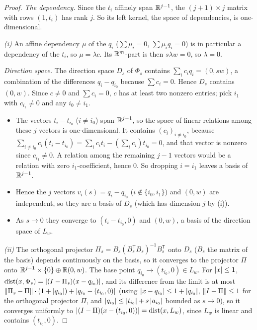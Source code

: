 \documentclass[11pt]{article}
\begin{document}
\begin{proof}
\emph{The dependency.} Since the $t_i$ affinely span $\mathbb{R}^{j-1}$, the $(j+1) \times j$ matrix with
rows $(1, t_i)$ has rank $j$. So its left kernel, the space of dependencies, is one-dimensional.

\emph{(i)} An affine dependency $\mu$ of the $q_i$ ($\sum \mu_i = 0$, $\sum \mu_i q_i = 0$) is in
particular a dependency of the $t_i$, so $\mu = \lambda c$. Its $\mathbb{R}^m$-part is then
$s \lambda w = 0$, so $\lambda = 0$.

\emph{Direction space.} The direction space $D_s$ of $\Phi_s$ contains
$\sum_i c_i q_i = (0, s w)$, a combination of the differences $q_i - q_{i_0}$ because
$\sum c_i = 0$. Hence $D_s$ contains $(0, w)$. Since $c \ne 0$ and $\sum c_i = 0$, $c$ has at least
two nonzero entries; pick $i_1$ with $c_{i_1} \ne 0$ and any $i_0 \ne i_1$.
\begin{itemize}
  \item The vectors $t_i - t_{i_0}$ ($i \ne i_0$) span $\mathbb{R}^{j-1}$, so the space of linear relations
    among these $j$ vectors is one-dimensional. It contains $(c_i)_{i \ne i_0}$, because
    $\sum_{i \ne i_0} c_i (t_i - t_{i_0}) = \sum_i c_i t_i - (\sum_i c_i) t_{i_0} = 0$, and that
    vector is nonzero since $c_{i_1} \ne 0$. A relation among the remaining $j-1$ vectors would be a
    relation with zero $i_1$-coefficient, hence $0$. So dropping $i = i_1$ leaves a basis of
    $\mathbb{R}^{j-1}$.
  \item Hence the $j$ vectors $v_i(s) = q_i - q_{i_0}$ ($i \notin \{i_0, i_1\}$) and $(0, w)$ are
    independent, so they are a basis of $D_s$ (which has dimension $j$ by (i)).
  \item As $s \to 0$ they converge to $(t_i - t_{i_0}, 0)$ and $(0, w)$, a basis of the direction
    space of $L_w$.
\end{itemize}

\emph{(ii)} The orthogonal projector $\Pi_s = B_s (B_s^{\mathsf T} B_s)^{-1} B_s^{\mathsf T}$ onto
$D_s$ ($B_s$ the matrix of the basis) depends continuously on the basis, so it converges to the
projector $\Pi$ onto $\mathbb{R}^{j-1} \times \{0\} \oplus \mathbb{R}(0, w)$. The base point
$q_{i_0} \to (t_{i_0}, 0) \in L_w$. For $\left|x\right| \le 1$,
$\operatorname{dist}(x, \Phi_s) = \left|(I - \Pi_s)(x - q_{i_0})\right|$, and its difference from the limit is at most
$\left\|\Pi_s - \Pi\right\| \cdot (1 + \left|q_{i_0}\right|) + \left|q_{i_0} - (t_{i_0}, 0)\right|$ (using
$\left|x - q_{i_0}\right| \le 1 + \left|q_{i_0}\right|$, $\left\|I - \Pi\right\| \le 1$ for the orthogonal projector $\Pi$,
and $\left|q_{i_0}\right| \le \left|t_{i_0}\right| + s\left|a_{i_0}\right|$ bounded as $s \to 0$), so it
converges uniformly to
$\left|(I - \Pi)(x - (t_{i_0}, 0))\right| = \operatorname{dist}(x, L_w)$, since $L_w$ is linear and contains
$(t_{i_0}, 0)$.


\end{proof}
\end{document}
